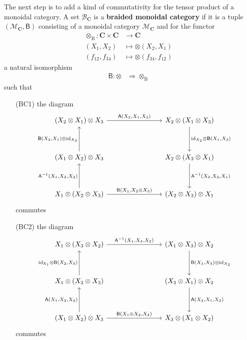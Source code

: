 \\\\
The next step is to add a kind of commutativity for the tensor product of a monoidal category. A set $\mathcal{B}_{\mathbf{C}}$ is a \textbf{braided monoidal category} if it is a tuple $(\mathcal{M}_{\mathbf{C}},\mathsf{B})$ consisting of a monoidal category $\mathcal{M}_{\mathbf{C}}$ and for the functor
\begin{align*}
  \otimes_{\textrm{B}}
  \colon
  \mathbf{C}
  \times
  \mathbf{C}
  &\rightarrow
  \mathbf{C}
  \\
  (X_{1},X_{2})
  &\mapsto
  \otimes(X_{2},X_{1})
  \\
  (f_{12},f_{34})
  &\mapsto
  \otimes(f_{34},f_{12})
\end{align*}
a natural isomorphism
\begin{align*}
  \mathsf{B}
  \colon
  \otimes
  &\Rightarrow
  \otimes_{\textrm{B}}
\end{align*}
such that
\begin{enumerate}
\item[(BC1)]
the diagram
\begin{equation*}
\begin{tikzcd}[row sep=huge,column sep=8em]
  (X_{2} \otimes X_{1})
  \otimes
  X_{3}
  \arrow{r}{\mathsf{A}(X_{2},X_{1},X_{3})}
  &
  X_{2}
  \otimes
  (X_{1} \otimes X_{3})
  \arrow{d}{\mathrm{id}_{X_{2}} \otimes \mathsf{B}(X_{1},X_{3})}
  \\
  (X_{1} \otimes X_{2})
  \otimes
  X_{3}
  \arrow{u}{\mathsf{B}(X_{2},X_{1}) \otimes \mathrm{id}_{X_{3}}}
  &
  X_{2}
  \otimes
  (X_{3} \otimes X_{1})
  \arrow{d}{\mathsf{A}^{-1}(X_{2},X_{3},X_{1})}
  \\
  X_{1}
  \otimes
  (X_{2} \otimes X_{3})
  \arrow{u}{\mathsf{A}^{-1}(X_{1},X_{2},X_{3})}
  \arrow{r}{\mathsf{B}(X_{1},X_{2} \otimes X_{3})}
  &
  (X_{2} \otimes X_{3})
  \otimes
  X_{1}
\end{tikzcd}
\end{equation*}
commutes
\item[(BC2)]
the diagram
\begin{equation*}
\begin{tikzcd}[row sep=huge,column sep=8em]
  X_{1}
  \otimes
  (X_{3} \otimes X_{2})
  \arrow{r}{\mathsf{A}^{-1}(X_{1},X_{3},X_{2})}
  &
  (X_{1} \otimes X_{3})
  \otimes
  X_{2}
  \arrow{d}{\mathsf{B}(X_{1},X_{3}) \otimes \mathrm{id}_{X_{2}}}
  \\
  X_{1}
  \otimes
  (X_{2} \otimes X_{3})
  \arrow{u}{\mathrm{id_{X_{1}}} \otimes \mathsf{B}(X_{2},X_{3})}
  &
  (X_{3} \otimes X_{1})
  \otimes
  X_{2}
  \arrow{d}{\mathsf{A}(X_{3},X_{1},X_{2})}
  \\
  (X_{1} \otimes X_{2})
  \otimes
  X_{3}
  \arrow{u}{\mathsf{A}(X_{1},X_{2},X_{3})}
  \arrow{r}{\mathsf{B}(X_{1} \otimes X_{2},X_{3})}
  &
  X_{3}
  \otimes
  (X_{1} \otimes X_{2})
\end{tikzcd}
\end{equation*}
commutes
\end{enumerate}
